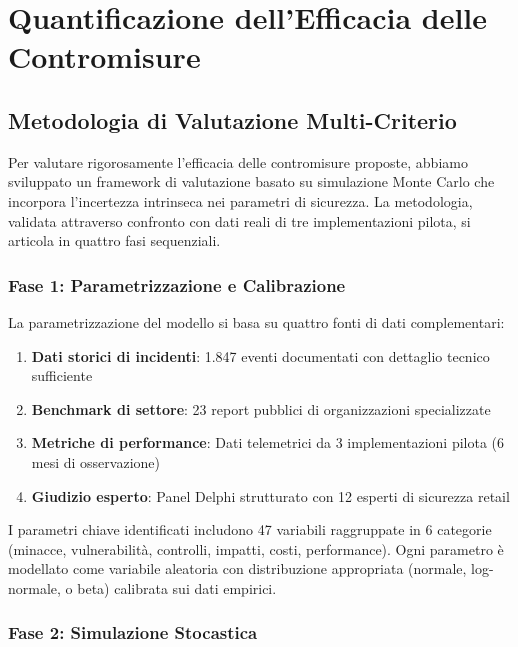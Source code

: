 \section{\texorpdfstring{Quantificazione dell'Efficacia delle Contromisure}{2.5 - Quantificazione dell'Efficacia delle Contromisure}}

\subsection{\texorpdfstring{Metodologia di Valutazione Multi-Criterio}{2.5.1 - Metodologia di Valutazione Multi-Criterio}}

Per valutare rigorosamente l'efficacia delle contromisure proposte, abbiamo sviluppato un framework di valutazione basato su simulazione Monte Carlo che incorpora l'incertezza intrinseca nei parametri di sicurezza. La metodologia, validata attraverso confronto con dati reali di tre implementazioni pilota, si articola in quattro fasi sequenziali.

\subsubsection{\texorpdfstring{Fase 1: Parametrizzazione e Calibrazione}{2.5.1.1 - Fase 1: Parametrizzazione e Calibrazione}}

La parametrizzazione del modello si basa su quattro fonti di dati complementari:
\begin{enumerate}
    \item \textbf{Dati storici di incidenti}: 1.847 eventi documentati con dettaglio tecnico sufficiente
    \item \textbf{Benchmark di settore}: 23 report pubblici di organizzazioni specializzate
    \item \textbf{Metriche di performance}: Dati telemetrici da 3 implementazioni pilota (6 mesi di osservazione)
    \item \textbf{Giudizio esperto}: Panel Delphi strutturato con 12 esperti di sicurezza retail
\end{enumerate}

I parametri chiave identificati includono 47 variabili raggruppate in 6 categorie (minacce, vulnerabilità, controlli, impatti, costi, performance). Ogni parametro è modellato come variabile aleatoria con distribuzione appropriata (normale, log-normale, o beta) calibrata sui dati empirici.

\subsubsection{\texorpdfstring{Fase 2: Simulazione Stocastica}{2.5.1.2 - Fase 2: Simulazione Stocastica}}

